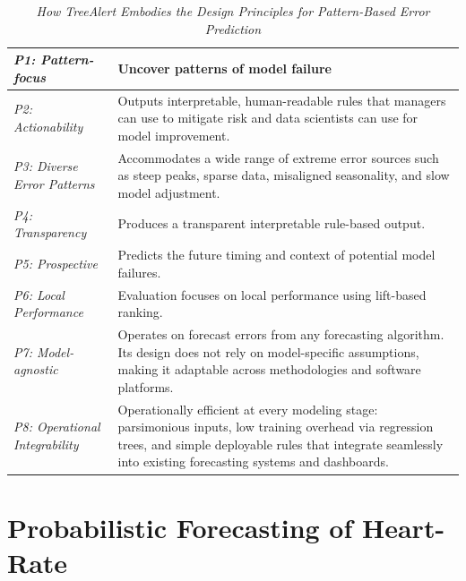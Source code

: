 \documentclass[]{interact}
\theoremstyle{plain}
\theoremstyle{definition}
\theoremstyle{remark}
\begin{document}
\begin{table}
\centering
\caption{\textit{How TreeAlert Embodies the Design Principles for Pattern-Based Error
Prediction}}
\small
\begin{tabular}{|m{3cm}|m{12.4cm}|}
\hline
\centering\textit{P1: Pattern-focus} &
Uncover patterns of model failure \\
\hline
\centering\textit{P2: Actionability} &
Outputs interpretable, human-readable rules that managers can use to mitigate risk and data
scientists can use for model improvement. \\
\hline
\centering\textit{P3: Diverse Error Patterns} &
Accommodates a wide range of extreme error sources such as steep peaks, sparse data,
misaligned seasonality, and slow model adjustment. \\
\hline
\centering\textit{P4: Transparency} &
Produces a transparent interpretable rule-based output. \\
\hline
\centering\textit{P5: Prospective} &
Predicts the future timing and context of potential model failures. \\
\hline
\centering\textit{P6: Local Performance} &
Evaluation focuses on local performance using lift-based ranking. \\
\hline
\centering\textit{P7: Model-agnostic} &
Operates on forecast errors from any forecasting algorithm. Its design does not rely on
model-specific assumptions, making it adaptable across methodologies and software platforms. \\
\hline
\centering\textit{P8: Operational Integrability} &
Operationally efficient at every modeling stage: parsimonious inputs, low training overhead
via regression trees, and simple deployable rules that integrate seamlessly into existing
forecasting systems and dashboards. \\
\hline
\end{tabular}
\label{tab:design}
\end{table}




\appendix

\section{Probabilistic Forecasting of Heart-Rate}
\label{app:probabilistic_treealert}
\end{document}
